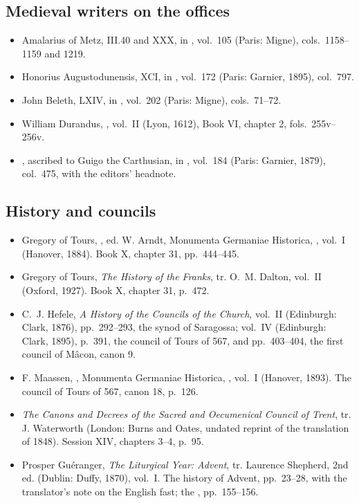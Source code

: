 \subsection{Medieval writers on the offices}

\begin{itemize}[leftmargin=1.3em, itemsep=0.3em]
\item Amalarius of Metz,  III.40 and 
XXX, in , vol.~105 (Paris: Migne), cols.~1158--1159 and 1219.
\item Honorius Augustodunensis,  XCI, in , vol.~172
(Paris: Garnier, 1895), col.~797.
\item John Beleth,  LXIV, in ,
vol.~202 (Paris: Migne), cols.~71--72.
\item William Durandus, , vol.~II (Lyon, 1612), Book VI,
chapter 2, fols.~255v--256v.
\item {}, ascribed to Guigo the Carthusian, in ,
vol.~184 (Paris: Garnier, 1879), col.~475, with the editors' headnote.
\end{itemize}

\subsection{History and councils}

\begin{itemize}[leftmargin=1.3em, itemsep=0.3em]
\item Gregory of Tours, , ed. W. Arndt, Monumenta Germaniae Historica,
, vol.~I (Hanover, 1884). Book X, chapter 31,
pp.~444--445.
\item Gregory of Tours, \textit{The History of the Franks}, tr. O.~M. Dalton, vol.~II (Oxford,
1927). Book X, chapter 31, p.~472.
\item C.~J. Hefele, \textit{A History of the Councils of the Church}, vol.~II (Edinburgh: Clark,
1876), pp.~292--293, the synod of Saragossa; vol.~IV (Edinburgh: Clark, 1895), p.~391, the council
of Tours of 567, and pp.~403--404, the first council of Mâcon, canon 9.
\item F. Maassen, , Monumenta Germaniae Historica,
, vol.~I (Hanover, 1893). The council of Tours of 567, canon 18, p.~126.
\item \textit{The Canons and Decrees of the Sacred and Oecumenical Council of Trent}, tr. J.
Waterworth (London: Burns and Oates, undated reprint of the translation of 1848). Session XIV,
chapters 3--4, p.~95.
\item Prosper Guéranger, \textit{The Liturgical Year: Advent}, tr. Laurence Shepherd, 2nd ed.
(Dublin: Duffy, 1870), vol.~I. The history of Advent, pp.~23--28, with the translator's note on
the English fast; the , pp.~155--156.
\end{itemize}

